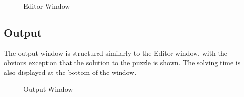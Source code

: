 \documentclass{article}
\begin{document}
\begin{figure}[h!]
\begin{center}
	\caption{Editor Window}
\end{center}
\end{figure}

\subsection*{Output}
The output window is structured similarly to the Editor window, with the obvious exception that the solution to the puzzle is shown. The solving time is also displayed at the bottom of the window.

\begin{figure}[h!]
\begin{center}
	\caption{Output Window}
\end{center}
\end{figure}
\end{document}
